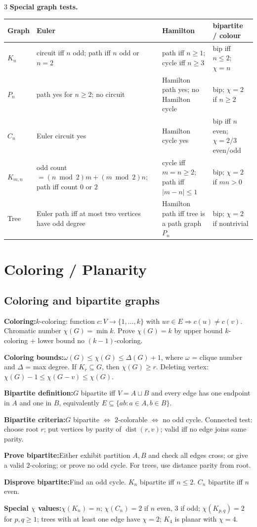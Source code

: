 \documentclass[10pt]{article}
\newcommand{\dist}{\operatorname{dist}}
\newenvironment{cheatitems}{\par\vspace{-1pt}}{\par\vspace{-1pt}}
\newcommand{\cheatrow}[2]{\par\noindent\textbf{#1:}\enspace #2\par}
\begin{document}
\begin{multicols}{3}
\vspace{1pt}\noindent\textbf{Special graph tests.}\par
\begin{tabular}{@{}p{}p{}p{}p{}@{}}
\toprule
Graph & Euler & Hamilton & bipartite / colour\\
\midrule
$K_n$ & circuit iff $n$ odd; path iff $n$ odd or $n=2$ & path iff $n\ge1$; cycle iff $n\ge3$ & bip iff $n\le2$; $\chi=n$\\
$P_n$ & path yes for $n\ge2$; no circuit & Hamilton path yes; no Hamilton cycle & bip; $\chi=2$ if $n\ge2$\\
$C_n$ & Euler circuit yes & Hamilton cycle yes & bip iff $n$ even; $\chi=2/3$ even/odd\\
$K_{m,n}$ & odd count $=(n\bmod2)m+(m\bmod2)n$; path iff count $0$ or $2$ & cycle iff $m=n\ge2$; path iff $|m-n|\le1$ & bip; $\chi=2$ if $mn>0$\\
Tree & Euler path iff at most two vertices have odd degree & Hamilton path iff tree is a path graph $P_n$ & bip; $\chi=2$ if nontrivial\\
\bottomrule
\end{tabular}


\section*{Coloring / Planarity}
\subsection*{Coloring and bipartite graphs}
\begin{cheatitems}
\cheatrow{Coloring}{$k$-coloring: function $c:V\to\{1,\ldots,k\}$ with $uv\in E\Rightarrow c(u)\ne c(v)$. Chromatic number $\chi(G)=\min k$. Prove $\chi(G)=k$ by upper bound $k$-coloring + lower bound no $(k-1)$-coloring.}
\cheatrow{Coloring bounds}{$\omega(G)\le\chi(G)\le\Delta(G)+1$, where $\omega$ = clique number and $\Delta$ = max degree. If $K_r\subseteq G$, then $\chi(G)\ge r$. Deleting vertex: $\chi(G)-1\le\chi(G-v)\le\chi(G)$.}
\cheatrow{Bipartite definition}{$G$ bipartite iff $V=A\sqcup B$ and every edge has one endpoint in $A$ and one in $B$, equivalently $E\subseteq\{ab:a\in A,b\in B\}$.}
\cheatrow{Bipartite criteria}{$G$ bipartite $\iff$ $2$-colorable $\iff$ no odd cycle. Connected test: choose root $r$; put vertices by parity of $\dist(r,v)$; valid iff no edge joins same parity.}
\cheatrow{Prove bipartite}{Either exhibit partition $A,B$ and check all edges cross; or give a valid $2$-coloring; or prove no odd cycle. For trees, use distance parity from root.}
\cheatrow{Disprove bipartite}{Find an odd cycle. $K_n$ bipartite iff $n\le2$. $C_n$ bipartite iff $n$ even.}
\cheatrow{Special $\chi$ values}{$\chi(K_n)=n$; $\chi(C_n)=2$ if $n$ even, $3$ if odd; $\chi(K_{p,q})=2$ for $p,q\ge1$; trees with at least one edge have $\chi=2$; $K_4$ is planar with $\chi=4$.}
\end{cheatitems}


\end{multicols}
\end{document}
